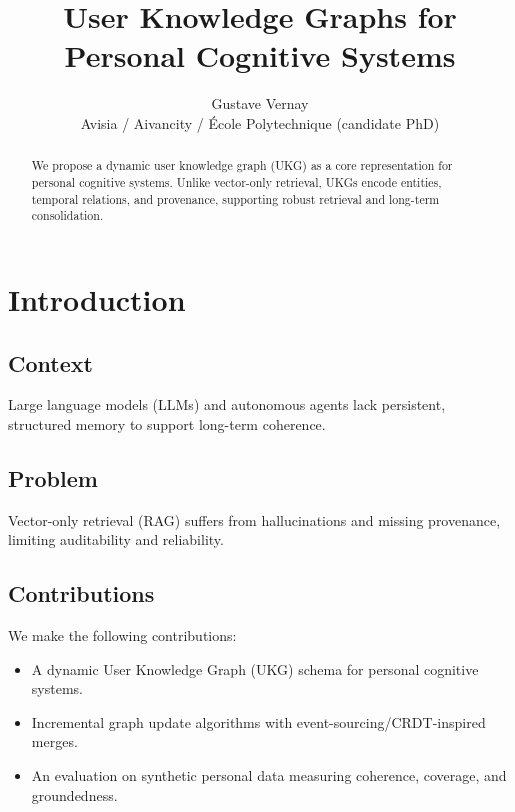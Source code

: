 \documentclass[10pt]{article}
\title{User Knowledge Graphs for Personal Cognitive Systems}
\author{Gustave Vernay \\ Avisia / Aivancity / \'{E}cole Polytechnique (candidate PhD)}
\date{}
\begin{document}
\maketitle

\begin{abstract}
We propose a dynamic user knowledge graph (UKG) as a core representation for personal cognitive systems. Unlike vector-only retrieval, UKGs encode entities, temporal relations, and provenance, supporting robust retrieval and long-term consolidation.
\end{abstract}

\section{Introduction}
\subsection{Context}
Large language models (LLMs) and autonomous agents lack persistent, structured memory to support long-term coherence.

\subsection{Problem}
Vector-only retrieval (RAG) suffers from hallucinations and missing provenance, limiting auditability and reliability.

\subsection{Contributions}
We make the following contributions:
\begin{itemize}
	\item A dynamic User Knowledge Graph (UKG) schema for personal cognitive systems.
	\item Incremental graph update algorithms with event-sourcing/CRDT-inspired merges.
	\item An evaluation on synthetic personal data measuring coherence, coverage, and groundedness.
\end{itemize}

\end{document}
